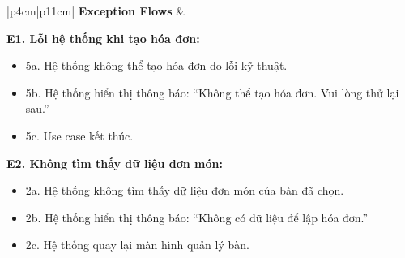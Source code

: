 \begin{longtable}{|p{4cm}|p{11cm}|}
\textbf{Exception Flows} &
\begin{minipage}[t]{\linewidth}
\vspace{0.3mm}

\textbf{E1. Lỗi hệ thống khi tạo hóa đơn:}

\begin{itemize}
\item 5a. Hệ thống không thể tạo hóa đơn do lỗi kỹ thuật.
\item 5b. Hệ thống hiển thị thông báo: ``Không thể tạo hóa đơn. Vui lòng thử lại sau.''
\item 5c. Use case kết thúc.
\end{itemize}

\textbf{E2. Không tìm thấy dữ liệu đơn món:}

\begin{itemize}
\item 2a. Hệ thống không tìm thấy dữ liệu đơn món của bàn đã chọn.
\item 2b. Hệ thống hiển thị thông báo: ``Không có dữ liệu để lập hóa đơn.''
\item 2c. Hệ thống quay lại màn hình quản lý bàn.
\end{itemize}

\vspace{0.3mm}
\end{minipage}
\\ \hline

\end{longtable}


